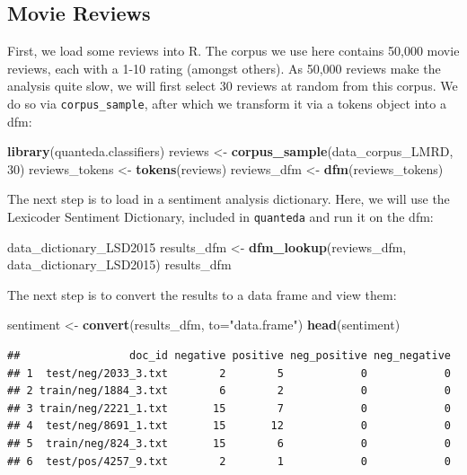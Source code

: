 \documentclass[
]{book}
\newenvironment{Shaded}{\begin{snugshade}}{\end{snugshade}}
\newcommand{\AttributeTok}[1]{\textcolor[rgb]{0.13,0.29,0.53}{#1}}
\newcommand{\DecValTok}[1]{\textcolor[rgb]{0.00,0.00,0.81}{#1}}
\newcommand{\FunctionTok}[1]{\textcolor[rgb]{0.13,0.29,0.53}{\textbf{#1}}}
\newcommand{\NormalTok}[1]{#1}
\newcommand{\OtherTok}[1]{\textcolor[rgb]{0.56,0.35,0.01}{#1}}
\newcommand{\StringTok}[1]{\textcolor[rgb]{0.31,0.60,0.02}{#1}}
\begin{document}
\subsection{Movie Reviews}\label{movie-reviews}

First, we load some reviews into R. The corpus we use here contains 50,000 movie reviews, each with a 1-10 rating (amongst others). As 50,000 reviews make the analysis quite slow, we will first select 30 reviews at random from this corpus. We do so via \texttt{corpus\_sample}, after which we transform it via a tokens object into a dfm:

\begin{Shaded}
\begin{Highlighting}[]
\FunctionTok{library}\NormalTok{(quanteda.classifiers)}
\NormalTok{reviews }\OtherTok{\textless{}{-}} \FunctionTok{corpus\_sample}\NormalTok{(data\_corpus\_LMRD, }\DecValTok{30}\NormalTok{)}
\NormalTok{reviews\_tokens }\OtherTok{\textless{}{-}} \FunctionTok{tokens}\NormalTok{(reviews)}
\NormalTok{reviews\_dfm }\OtherTok{\textless{}{-}} \FunctionTok{dfm}\NormalTok{(reviews\_tokens)}
\end{Highlighting}
\end{Shaded}

The next step is to load in a sentiment analysis dictionary. Here, we will use the Lexicoder Sentiment Dictionary, included in \texttt{quanteda} and run it on the dfm:

\begin{Shaded}
\begin{Highlighting}[]
\NormalTok{data\_dictionary\_LSD2015}
\NormalTok{results\_dfm }\OtherTok{\textless{}{-}} \FunctionTok{dfm\_lookup}\NormalTok{(reviews\_dfm, data\_dictionary\_LSD2015)}
\NormalTok{results\_dfm}
\end{Highlighting}
\end{Shaded}

The next step is to convert the results to a data frame and view them:

\begin{Shaded}
\begin{Highlighting}[]
\NormalTok{sentiment }\OtherTok{\textless{}{-}} \FunctionTok{convert}\NormalTok{(results\_dfm, }\AttributeTok{to=}\StringTok{"data.frame"}\NormalTok{)}
\FunctionTok{head}\NormalTok{(sentiment)}
\end{Highlighting}
\end{Shaded}

\begin{verbatim}
##                 doc_id negative positive neg_positive neg_negative
## 1  test/neg/2033_3.txt        2        5            0            0
## 2 train/neg/1884_3.txt        6        2            0            0
## 3 train/neg/2221_1.txt       15        7            0            0
## 4  test/neg/8691_1.txt       15       12            0            0
## 5  train/neg/824_3.txt       15        6            0            0
## 6  test/pos/4257_9.txt        2        1            0            0
\end{verbatim}
\end{document}
